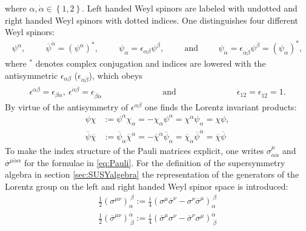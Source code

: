 where $\alpha,\dot{\alpha} \in \left\{ 1,2 \right\}$. Left handed Weyl spinors are labeled with undotted and right handed Weyl spinors with dotted indices. One distinguishes four different Weyl spinors:
\begin{align}
\psi^\alpha, \hspace{1cm} 
\overline{\psi}^{\dot{\alpha}} = (\psi^\alpha)^\ast, \hspace{1cm} \psi_\alpha = \epsilon_{\alpha\beta}\psi^\beta, \hspace{1cm} \mathrm{and} \hspace{1cm} \psi_{\dot{\alpha}} = \epsilon_{\dot{\alpha}\dot{\beta}}\psi^{\dot{\beta}} = (\psi_\alpha)^\ast,
\end{align}
where $^\ast$ denotes complex conjugation and indices are lowered with the antisymmetric $\epsilon_{\alpha\beta}$ ($\epsilon_{\dot{\alpha}\dot{\beta}}$), which obeys
\begin{align}
\epsilon^{\alpha\beta} = \epsilon_{\beta\alpha},\ \epsilon^{\dot{\alpha}\dot{\beta}} = \epsilon_{\dot{\beta}\dot{\alpha}} \hspace{3cm} \mathrm{and} \hspace{3cm} \epsilon_{12} = \epsilon_{\dot{1}\dot{2}}= 1.
\end{align}
By virtue of the antisymmetry of $\epsilon^{\alpha \beta}$ one finds the Lorentz invariant products:
\begin{align}
\psi\chi &:= \psi^\alpha\chi_\alpha = -\chi_\alpha\psi^\alpha = \chi^\alpha\psi_\alpha = \chi\psi,\nonumber\\
\overline{\psi}\overline{\chi} &:= \overline{\psi}_{\dot{\alpha}} \overline{\chi}^{\dot{\alpha}} = -\overline{\chi}^{\dot{\alpha}}\overline{\psi}_{\dot{\alpha}} = \overline{\chi}_{\dot{\alpha}}\overline{\psi}^{\dot{\alpha}} = \overline{\chi}\overline{\psi} \label{eq:Weylspinorproduct}
\end{align}
To make the index structure of the Pauli matrices explicit, one writes $\sigma^\mu_{\alpha\dot{\alpha}}$ and $\overline{\sigma}^{\mu\dot{\alpha}\alpha}$ for the formulae in \ref{eq:Pauli}. For the definition of the supersymmetry algebra in section \ref{sec:SUSYalgebra} the representation of the generators of the Lorentz group on the left and right handed Weyl spinor space is introduced:
\begin{align}
\frac{1}{2}(\sigma^{\mu\nu})_\alpha^{\ \beta} := \frac{i}{4}(\sigma^\mu\overline{\sigma}^\nu - \sigma^\nu\overline{\sigma}^\mu)_\alpha^{\ \beta}\nonumber\\
\frac{1}{2}(\overline{\sigma}^{\mu\nu})^{\dot{\alpha}}_{\ \dot{\beta}} := \frac{i}{4}(\overline{\sigma}^\mu\sigma^\nu - \overline{\sigma}^\nu\sigma^\mu)^{\dot{\alpha}}_{\ \dot{\beta}}
\end{align}

